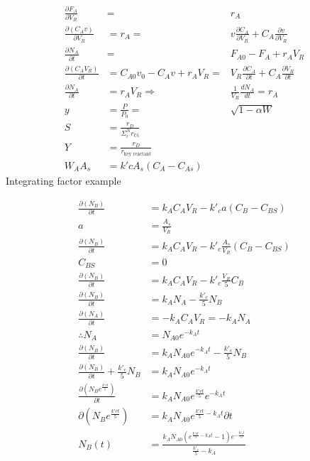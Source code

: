 \documentclass[a4paper]{article}
\newcommand{\pfrac}[2]{ \frac{ \partial (#1)}{ \partial #2}}
\begin{document}
\begin{eqnarray}
	\frac{ \partial F_A}{ \partial V_R}&=& r_A\label{PFR des eq}\\
	\frac{ \partial( C_A v)}{ \partial V_R}&= r_A =& v\frac{ \partial C_A}{ \partial V_R}+C_A\frac{ \partial v}{ \partial V_R}\\
	\frac{ \partial N_A}{ \partial t}&=& F_{A0}-F_A+r_A V_R\label{CSTR des eq}\\
	\frac{ \partial (C_A V_R)}{ \partial t}&= C_{A0}v_0-C_A v+r_A V_R =& V_R \frac{\partial C_A}{ \partial t}+ C_A \frac{ \partial V_R}{ \partial t}\\
	\frac{ \partial N_A}{ \partial t}&= r_A V_R \Rightarrow& \frac{1}{V_R}\frac{dN_A}{dt}=r_A\label{Batch}\\
	y &= \frac{P}{P_0}=&\sqrt{1-\alpha W}\label{Ergun}\\
	S &= \frac{r_D}{\Sigma_i^N r_{Ui}}\\
	Y &= \frac{r_D}{r_{\text{key reactant}}}\\
	W_A A_s &= k'c A_s (C_A - C_{As})
\end{eqnarray}
Integrating factor example
\begin{list}{ }{ }
\item \begin{eqnarray}
		\pfrac{N_B}{t}&=k_A C_A V_R - k'_c a (C_B-C_{BS})\\
		a&=\frac{A_s}{V_R}\\
		\pfrac{N_B}{t}&=k_A C_A V_R - k'_c \frac{A_s}{V_R} (C_B-C_{BS})\\
		C_{BS}&=0\\
		\pfrac{N_B}{t}&=k_A C_A V_R - k'_c \frac{V_R}{5}C_B\\
		\pfrac{N_B}{t}&=k_A N_A - \frac{k'_c}{5} N_B\\
		\pfrac{N_A}{t}&=-k_A C_A V_R = -k_A N_A\\
		\therefore N_A &= N_{A0}e^{-k_A t}\\
		\pfrac{N_B}{t}&=k_A N_{A0}e^{-k_A t}- \frac{k'_c}{5} N_B\\
		\pfrac{N_B}{t}+\frac{k'_c}{5} N_B &= k_A N_{A0} e^{-k_A t}\\
		\pfrac{N_B e^{\frac{k'c t}{5}}}{t} &= k_A N_{A0} e^{\frac{k'c t}{5}} e^{-k_A t}\\
		\partial (N_B e^{\frac{k'c t}{5}}) &= k_A N_{A0} e^{\frac{k'c t}{5}-k_A t} \partial t\\
		N_B(t) &= \frac{k_A N_{A0}(e^{\frac{k'c t}{5}-k_A t}-1)e^{-\frac{k'_c t}{5}}}{\frac{k'_c}{5}-k_A}
	\end{eqnarray}
\item 
\end{list}
\end{document}
